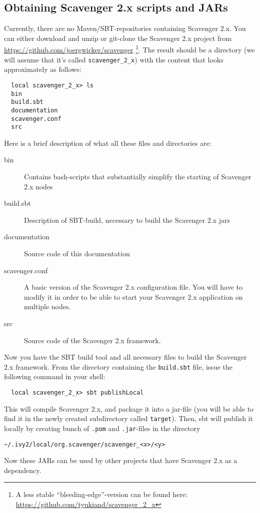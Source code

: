 \documentclass{scrbook}
\begin{document}
\subsection{Obtaining Scavenger 2.x scripts and JARs}
Currently, there are no Maven/SBT-repositories containing Scavenger 2.x.
You can either download and unzip or git-clone the Scavenger 2.x project from 
\url{https://github.com/joergwicker/scavenger} \footnote{
  A less stable ``bleeding-edge''-version can be found here:
  \url{https://github.com/tyukiand/scavenger_2_x}
}.
The result should be a directory (we will assume that it's called \lstinline{scavenger_2_x}) with the content that 
looks approximately as follows:
\begin{lstlisting}
  local scavenger_2_x> ls
  bin
  build.sbt
  documentation
  scavenger.conf
  src
\end{lstlisting}
Here is a brief description of what all these files and directories are:
\begin{description}
  \item[bin] Contains bash-scripts that substantially simplify the
    starting of Scavenger 2.x nodes
  \item[build.sbt] Description of SBT-build, necessary to build the 
    Scavenger 2.x jars
  \item[documentation] Source code of this documentation
  \item[scavenger.conf] A basic version of the Scavenger 2.x configuration
    file. You will have to modify it in order to be able to start your
    Scavenger 2.x application on multiple nodes.
  \item[src] Source code of the Scavenger 2.x framework.
\end{description}

Now you have the SBT build tool and all necessary files to build 
the Scavenger 2.x framework. From the directory containing the
\lstinline{build.sbt} file, issue the following command in your shell:
\begin{lstlisting}
  local scavenger_2_x> sbt publishLocal
\end{lstlisting}
This will compile Scavenger 2.x, and package it into a jar-file 
(you will be able to find it in the newly created subdirectory
called \lstinline{target}). 
Then, sbt will publish it locally by creating bunch of \lstinline{.pom} and \lstinline{.jar}-files in the directory 
\begin{lstlisting}
~/.ivy2/local/org.scavenger/scavenger_<x>/<y>
\end{lstlisting} 
Now these JARs can be 
used by other projects that have Scavenger 2.x as a dependency.
\end{document}
